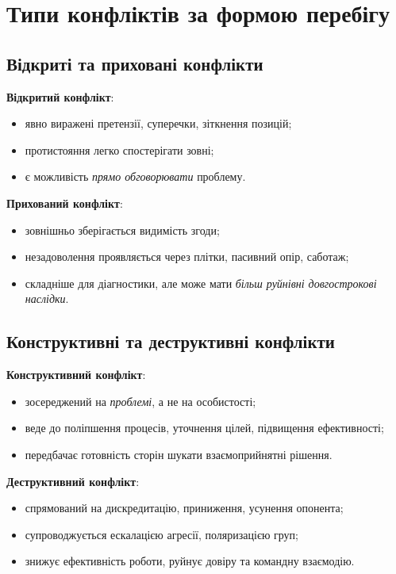 \documentclass[12pt,a4paper]{article}
\begin{document}
    \section*{Типи конфліктів за формою перебігу}
    \subsection*{Відкриті та приховані конфлікти}
    \textbf{Відкритий конфлікт}:
    \begin{itemize}
        \item явно виражені претензії, суперечки, зіткнення позицій;
        \item протистояння легко спостерігати зовні;
        \item є можливість \textit{прямо обговорювати} проблему.
    \end{itemize}

    \textbf{Прихований конфлікт}:
    \begin{itemize}
        \item зовнішньо зберігається видимість згоди;
        \item незадоволення проявляється через плітки, пасивний опір, саботаж;
        \item складніше для діагностики, але може мати \textit{більш руйнівні довгострокові наслідки}.
    \end{itemize}

    \subsection*{Конструктивні та деструктивні конфлікти}
    \textbf{Конструктивний конфлікт}:
    \begin{itemize}
        \item зосереджений на \textit{проблемі}, а не на особистості;
        \item веде до поліпшення процесів, уточнення цілей, підвищення ефективності;
        \item передбачає готовність сторін шукати взаємоприйнятні рішення.
    \end{itemize}

    \textbf{Деструктивний конфлікт}:
    \begin{itemize}
        \item спрямований на дискредитацію, приниження, усунення опонента;
        \item супроводжується ескалацією агресії, поляризацією груп;
        \item знижує ефективність роботи, руйнує довіру та командну взаємодію.
    \end{itemize}
\end{document}
